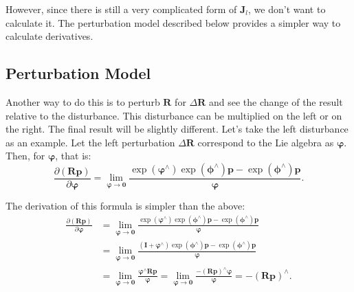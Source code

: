 However, since there is still a very complicated form of $\mathbf{J}_l$, we don't want to calculate it. The perturbation model described below provides a simpler way to calculate derivatives.

\subsection{Perturbation Model}
Another way to do this is to perturb $\mathbf{R}$ for $\Delta \mathbf{R}$ and see the change of the result relative to the disturbance. This disturbance can be multiplied on the left or on the right. The final result will be slightly different. Let's take the left disturbance as an example. Let the left perturbation $\Delta \mathbf{R}$ correspond to the Lie algebra as $\boldsymbol{\varphi}$. Then, for $\boldsymbol{\varphi}$, that is:
\begin{equation}
\frac{{\partial \left( {\mathbf{Rp}} \right)}}{{\partial \boldsymbol{\varphi} }} = \mathop {\lim }\limits_{\boldsymbol{\varphi}  \to \mathbf{0}} \frac{{\exp \left( {{\boldsymbol{\varphi} ^ \wedge }} \right)\exp \left( {{\boldsymbol{\phi} ^ \wedge }} \right)\mathbf{p} - \exp \left( {{\boldsymbol{\phi} ^ \wedge }} \right)\mathbf{p}}}{\boldsymbol{\varphi} }.
\end{equation}

The derivation of this formula is simpler than the above:
\begin{align*}
\frac{{\partial \left( {\mathbf{Rp}} \right)}}{{\partial \boldsymbol{\varphi} }} &= \mathop {\lim }\limits_{\boldsymbol{\varphi}  \to \mathbf{0}} \frac{{\exp \left( {{\boldsymbol{\varphi} ^ \wedge }} \right)\exp \left( {{\boldsymbol{\phi} ^ \wedge }} \right)\mathbf{p} - \exp \left( {{\boldsymbol{\phi} ^ \wedge }} \right)\mathbf{p}}}{ \boldsymbol{\varphi} }\\
&= \mathop {\lim }\limits_{\boldsymbol{\varphi } \to \mathbf{0}} \frac{{\left( {\mathbf{I} + {\boldsymbol{\varphi }^ \wedge }} \right)\exp \left( {{\boldsymbol{\phi} ^ \wedge }} \right)\mathbf{p} - \exp \left( {{\boldsymbol{\phi} ^ \wedge }} \right)\mathbf{p}}}{\boldsymbol{\varphi} }\\
&= \mathop {\lim }\limits_{\boldsymbol{\varphi}  \to \mathbf{0}} \frac{{{\boldsymbol{\varphi} ^ \wedge }\mathbf{Rp}}}{\boldsymbol{\varphi} } = \mathop {\lim }\limits_{\boldsymbol{\varphi}  \to \mathbf{0}} \frac{{ - {{\left( \mathbf{Rp} \right)}^ \wedge }\boldsymbol{\varphi} }}{\boldsymbol{\varphi} } =  - {\left( \mathbf{Rp} \right)^ \wedge }.
\end{align*}

